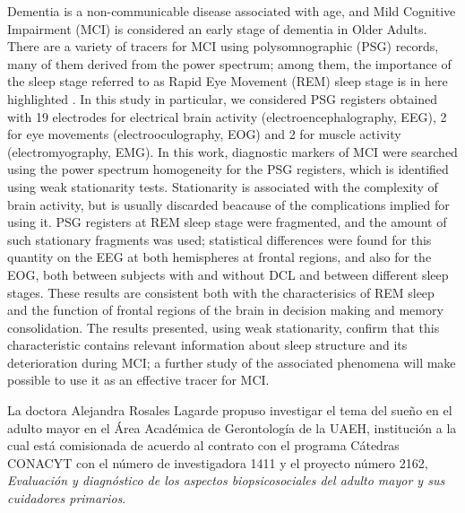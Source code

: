 \documentclass[12pt,letterpaper]{book}
\begin{document}
\begin{small}
Dementia is a non-communicable disease associated with age, and Mild Cognitive Impairment (MCI) is considered an early stage of dementia in Older Adults.
%
There are a variety of tracers for MCI using polysomnographic (PSG) records, many of them derived from the power spectrum; among them, the importance of the sleep stage referred to as Rapid Eye Movement (REM) sleep stage is in here highlighted .
%
In this study in particular, we considered PSG registers obtained with 19 electrodes for electrical brain activity (electroencephalography, EEG), 2 for eye movements (electrooculography, EOG) and 2 for muscle activity (electromyography, EMG).
%
In this work, diagnostic markers of MCI were searched using the power spectrum homogeneity for the PSG registers, which is identified using weak stationarity tests.
%
Stationarity is associated with the complexity of brain activity, but is usually discarded beacause of the complications implied for using it.
%
PSG registers at REM sleep stage were fragmented, and the amount of such stationary fragments was used;
statistical differences were found for this quantity on the EEG at both hemispheres at frontal regions, and also for the EOG, both between subjects with and without DCL and between different sleep stages.
%
These results are consistent both with the characterisics of REM sleep and the function of frontal regions of the brain in decision making and memory consolidation.
%
The results presented, using weak stationarity, confirm that this characteristic contains relevant information about sleep structure and its deterioration during MCI; a further study of the associated phenomena will make possible to use it as an effective tracer for MCI.
\end{small}


\newpage

La doctora Alejandra Rosales Lagarde propuso investigar el tema del sueño en el adulto mayor en el Área Académica de Gerontología de la UAEH, institución a la cual está comisionada de acuerdo al  contrato con el programa Cátedras CONACYT con el número de investigadora 1411 y el proyecto número  2162, \textit{Evaluación y diagnóstico de los aspectos biopsicosociales del adulto mayor y sus  cuidadores primarios}. 
\end{document}

